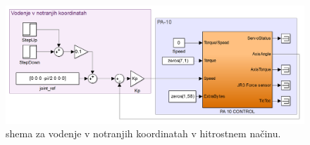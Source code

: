 \begin{figure}[]
	\centering
	\includegraphics[trim={0 0cm 0 0cm},scale=0.25]{./Slike/notranje_koordinate_vel.png}
	\caption{\simulink shema za vodenje v notranjih koordinatah v hitrostnem na\v{c}inu.}
	\label{fig:notranje_koordinate_vel}
\end{figure}

